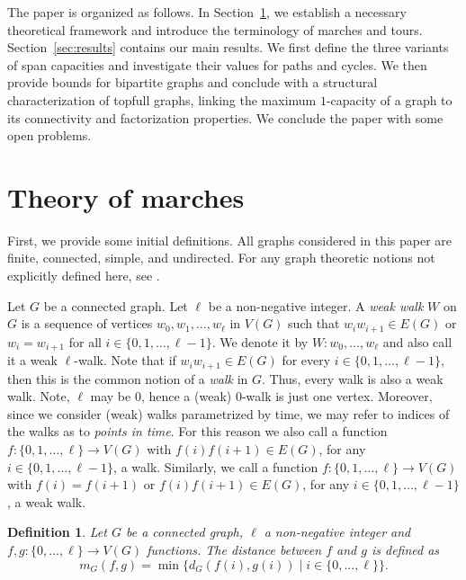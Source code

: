 \documentclass{article}
\newtheorem{definition}[theorem]{Definition}
\begin{document}
The paper is organized as follows. In Section~\ref{sec:definitions}, we establish a necessary theoretical framework and introduce the terminology of marches and tours. Section~\ref{sec:results} contains our main results. We first define the three variants of span capacities and investigate their values for paths and cycles. We then provide bounds for bipartite graphs and conclude with a structural characterization of topfull graphs, linking the maximum $1$-capacity of a graph to its connectivity and factorization properties.  We conclude the paper with some open problems.

\section{Theory of marches}\label{sec:definitions}

First, we provide some initial definitions. All graphs considered in this paper are finite, connected, simple, and undirected. For any graph theoretic notions not explicitly defined here, see \cite{west2001introduction}. 

Let $G$ be a connected graph. Let $\ell$ be a non-negative integer. A \emph{weak walk} $W$ on $G$ is a sequence of vertices $w_0, w_1, \ldots, w_\ell$ in $V(G)$ such that $w_i w_{i+1} \in E(G)$ or $w_i = w_{i+1}$ for all $i\in\{0, 1, \ldots, \ell-1\}$. We denote it by $W: w_0, \ldots, w_\ell$ and also call it a weak $\ell$-walk. Note that if $w_i w_{i+1} \in E(G)$ for every $i\in\{0, 1, \ldots, \ell-1\}$, then this is the common notion of a \emph{walk} in $G$. Thus, every walk is also a weak walk. Note, $\ell$ may be 0, hence a (weak) $0$-walk is just one vertex. Moreover, since we consider (weak) walks parametrized by time, we may refer to indices of the walks as to \emph{points in time}. For this reason we also call a function $f: \{0,1,\ldots, \ell\}\rightarrow V(G)$ with $f(i)f(i+1)\in E(G)$, for any $i\in\{0,1,\ldots, \ell-1\}$, a walk. Similarly, we call a function $f: \{0,1,\ldots, \ell\}\rightarrow V(G)$ with $f(i)=f(i+1)$ or $f(i)f(i+1)\in E(G)$, for any $i\in\{0,1,\ldots, \ell-1\}$, a weak walk. 

\begin{definition}\label{def:distance-tracks}
Let $G$ be a connected graph, $\ell$ a non-negative integer and $f,g:\{0,...,\ell\}\rightarrow V(G)$ functions. The \emph{distance between $f$ and $g$} is defined as
\[
m_G(f,g)= \min\{d_G( f(i), g(i)) \mid i \in \{0,...,\ell\}\}.
\]
\end{definition}
\end{document}
